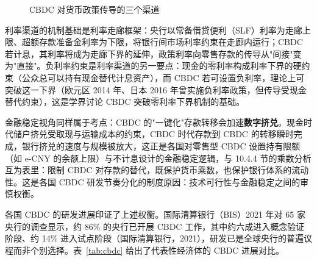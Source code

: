 \begin{figure}[htbp]
\centering
{}
\caption{CBDC 对货币政策传导的三个渠道}
\label{fig:cbdc}
\end{figure}

利率渠道的机制基础是利率走廊框架：央行以常备借贷便利（SLF）利率为走廊上限、超额存款准备金利率为下限，将银行间市场利率约束在走廊内运行；CBDC 若计息，其利率将成为走廊下界的延伸，政策利率向零售存款的传导从"间接"变为"直接"。负利率约束是利率渠道的另一要点：现金的零利率构成利率下界的硬约束（公众总可以持有现金替代计息资产），而 CBDC 若可设置负利率，理论上可突破这一下界（欧元区 2014 年、日本 2016 年曾实施负利率政策，但传导受现金替代约束），这是学界讨论 CBDC 突破零利率下界机制的基础。

金融稳定视角同样属于考点：CBDC 的"一键化"存款转移会加速\textbf{数字挤兑}。现金时代储户挤兑受取现与运输成本的约束，CBDC 时代存款到 CBDC 的转移瞬时完成，银行挤兑的速度与规模被放大，这正是各国对零售型 CBDC 设置持有限额（如 e-CNY 的余额上限）与不计息设计的金融稳定逻辑，与 10.4.4 节的乘数分析互为表里：限制 CBDC 对存款的替代，既保护货币乘数，也保护银行体系的流动性。这是各国 CBDC 研发节奏分化的制度原因：技术可行性与金融稳定之间的审慎权衡。

各国 CBDC 的研发进展印证了上述权衡。国际清算银行（BIS）2021 年对 65 家央行的调查显示，约 86\% 的央行已开展 CBDC 工作，其中约六成进入概念验证阶段、约 14\% 进入试点阶段（国际清算银行，2021），研发已是全球央行的普遍议程而非个别选择。表~\ref{tab:cbdc} 给出了代表性经济体的 CBDC 进展对比。

